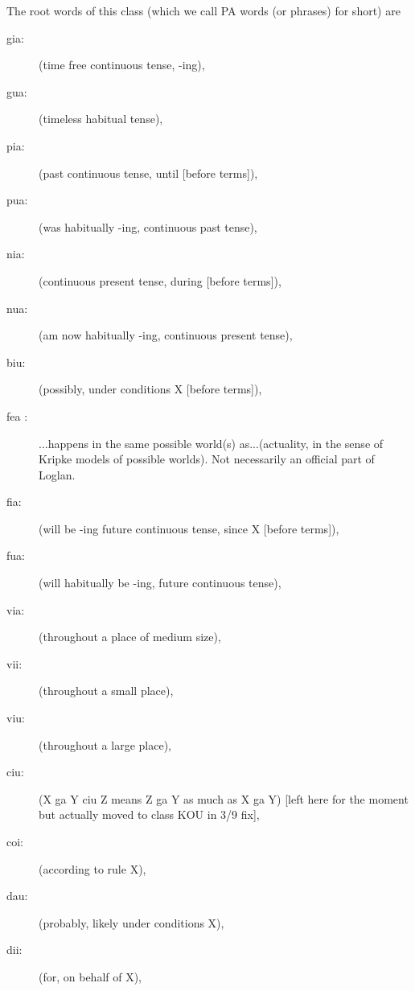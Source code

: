 \documentclass[12pt]{book}
\begin{document}
The root words of this class (which we call PA words (or phrases) for short) are
\begin{description}

\item[gia:] (time free continuous tense, -ing), 

\item[gua:]  (timeless habitual tense), 

\item[pia:]  (past continuous tense, until [before terms]), 

\item[pua:]  (was habitually -ing, continuous past tense), 

\item[nia:]  (continuous present tense, during [before terms]), 

\item[nua:]  (am now habitually -ing, continuous present tense), 

\item[biu:]  (possibly, under conditions X [before terms]), 

\item[fea :] ...happens in the same possible world(s) as...(actuality, in the sense of Kripke models of possible worlds).  Not necessarily an official part of Loglan.

\item[fia:]  (will be -ing future continuous tense, since X [before terms]), 

\item[fua:]  (will habitually be -ing, future continuous tense), 

\item[via:]  (throughout a place of medium size), 

\item[vii:]  (throughout a small place), 

\item[viu:]  (throughout a large place), 

\item[ciu:]  (X ga Y ciu Z means Z ga Y as much as X ga Y)  [left here for the moment but actually moved to class KOU in 3/9 fix],

\item[coi:]  (according to rule X), 

\item[dau:]  (probably, likely under conditions X), 

\item[dii:]  (for, on behalf of X), 


\end{description}
\end{document}
